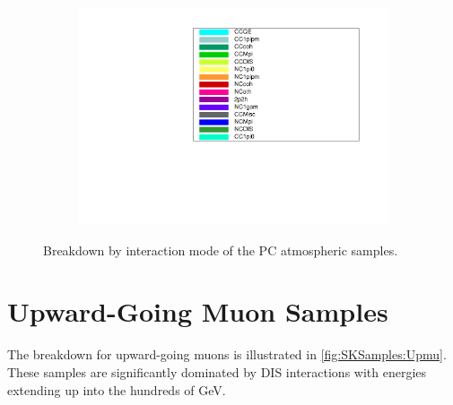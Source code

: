 \begin{figure}[ht]
\begin{subfigure}[t]{0.49\textwidth}
    \includegraphics[page=1,width=\textwidth, trim= 0 0 0 30, clip]{Figures/Selections/AtmosphericByMode/Legend.pdf}
    \end{subfigure}
    
    \caption{Breakdown by interaction mode of the PC atmospheric samples.}
    \label{fig:SKSamples:PC}
\end{figure}

\clearpage
\section{Upward-Going Muon Samples}
The breakdown for upward-going muons is illustrated in \autoref{fig:SKSamples:Upmu}. These samples are significantly dominated by DIS interactions with energies extending up into the hundreds of GeV.

